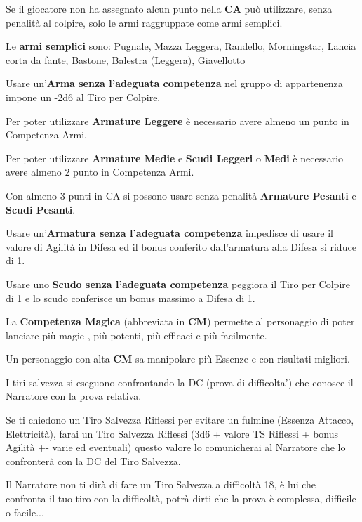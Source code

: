 \documentclass[a4paper,11pt,twoside,openany]{book}
\begin{document}
Se il giocatore non ha assegnato alcun punto nella \textbf{CA} può utilizzare, senza penalità al colpire, solo le armi raggruppate come armi semplici.

Le \textbf{armi semplici} sono: Pugnale, Mazza Leggera, Randello, Morningstar,
Lancia corta da fante, Bastone, Balestra (Leggera), Giavellotto

Usare un'\textbf{Arma senza l'adeguata competenza} nel gruppo di appartenenza impone un -2d6 al Tiro per Colpire.

Per poter utilizzare \textbf{Armature Leggere} è necessario avere almeno un punto in Competenza Armi.

Per poter utilizzare \textbf{Armature Medie} e \textbf{Scudi Leggeri} o \textbf{Medi} è necessario avere almeno 2 punto in Competenza Armi.

Con almeno 3 punti in CA si possono usare senza penalità \textbf{Armature Pesanti} e \textbf{Scudi Pesanti}.

Usare un'\textbf{Armatura senza l'adeguata competenza} impedisce di usare il valore di Agilità in Difesa ed il bonus conferito dall'armatura alla Difesa si riduce di 1.

Usare uno \textbf{Scudo senza l'adeguata competenza} peggiora il Tiro per Colpire di 1 e lo scudo conferisce un bonus massimo a Difesa di 1.

La \textbf{Competenza Magica} (abbreviata in \textbf{CM}) permette al personaggio di poter lanciare più magie , più potenti, più efficaci e più facilmente.

Un personaggio con alta \textbf{CM} sa manipolare più Essenze e con risultati migliori.

I tiri salvezza si eseguono confrontando la DC (prova di difficolta') che conosce il Narratore con la prova relativa.

Se ti chiedono un Tiro Salvezza Riflessi per evitare un fulmine (Essenza Attacco, Elettricità), farai un Tiro Salvezza Riflessi (3d6 + valore TS Riflessi + bonus Agilità +- varie ed eventuali) questo valore lo comunicherai al Narratore che lo confronterà con la DC del Tiro Salvezza.

Il Narratore non ti dirà di fare un Tiro Salvezza a difficoltà 18, è lui che confronta il tuo tiro con la difficoltà, potrà dirti che la prova è complessa, difficile o facile...
\end{document}
